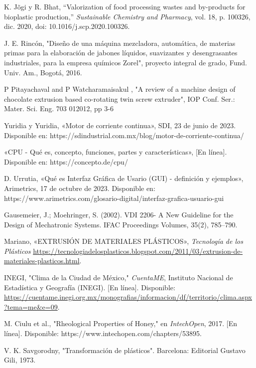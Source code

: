 \documentclass[14pt,oneside]{extarticle} %
\begin{document}
\begin{thebibliography}{5}
    K. Jõgi y R. Bhat, 
    ``Valorization of food processing wastes and by-products for bioplastic production,'' 
    \textit{Sustainable Chemistry and Pharmacy}, vol. 18, p. 100326, dic. 2020, 
    doi: 10.1016/j.scp.2020.100326.

    J. E. Rincón, "Diseño de una máquina mezcladora, automática, de materias primas para la elaboración de jabones líquidos, suavizantes y desengrasantes industriales, para la empresa químicos Zorel", proyecto integral de grado, Fund. Univ. Am., Bogotá, 2016.

    P Pitayachaval and P Watcharamaisakul , "A review of a machine design of chocolate extrusion based co-rotating twin screw extruder", IOP Conf. Ser.: Mater. Sci. Eng. 703 012012, pp 3-6

    Yuridia y Yuridia, «Motor de corriente continua», SDI, 23 de junio de 2023. Disponible en: https://sdindustrial.com.mx/blog/motor-de-corriente-continua/

    «CPU - Qué es, concepto, funciones, partes y características», [En línea]. Disponible en: https://concepto.de/cpu/    

    D. Urrutia, «Qué es Interfaz Gráfica de Usario (GUI) - definición y ejemplos», Arimetrics, 17 de octubre de 2023. Disponible en: https://www.arimetrics.com/glosario-digital/interfaz-grafica-usuario-gui

    Gausemeier, J.; Moehringer, S. (2002). VDI 2206- A New Guideline for the Design of Mechatronic Systems. IFAC Proceedings Volumes, 35(2), 785–790.

    Mariano, «EXTRUSIÓN DE MATERIALES PLÁSTICOS», \textit{Tecnología de los Plásticos} \url{https://tecnologiadelosplasticos.blogspot.com/2011/03/extrusion-de-materiales-plasticos.html}.

    INEGI, "Clima de la Ciudad de México," \textit{CuentaME}, Instituto Nacional de Estadística y Geografía (INEGI). [En línea]. Disponible: \url{https://cuentame.inegi.org.mx/monografias/informacion/df/territorio/clima.aspx?tema=me&e=09}.

    M. Ciulu et al., "Rheological Properties of Honey," en \textit{IntechOpen}, 2017. [En línea]. Disponible: https://www.intechopen.com/chapters/53895.

    V. K. Savgorodny, "Transformación de plásticos". Barcelona: Editorial Gustavo Gili, 1973.


\end{thebibliography}
\end{document}
